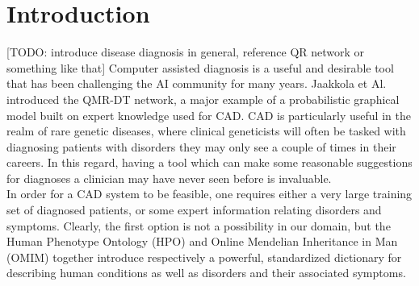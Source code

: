 \section{Introduction}
\label{sec:intro}

[TODO: introduce disease diagnosis in general, reference QR network or something like that]
Computer assisted diagnosis is a useful and desirable tool that has been challenging the AI community for many years. Jaakkola et Al. \cite{qmrdt} introduced the QMR-DT network, a major example  of a probabilistic graphical model built on expert knowledge used for CAD. 
CAD is particularly useful in the realm of rare genetic diseases, where clinical geneticists will often be tasked with diagnosing patients with disorders they may only see a couple of times in their careers. In this regard, having a tool which can make some reasonable suggestions for diagnoses a clinician may have never seen before is invaluable. \\
In order for a CAD system to be feasible, one requires either a very large training set of diagnosed patients, or some expert information relating disorders and symptoms. Clearly, the first option is not a possibility in our domain, but the Human Phenotype Ontology (HPO) \cite{kohler2014hpo} and Online Mendelian Inheritance in Man (OMIM) \cite{omim} together introduce respectively a powerful, standardized dictionary for describing human conditions as well as disorders and their associated symptoms.

